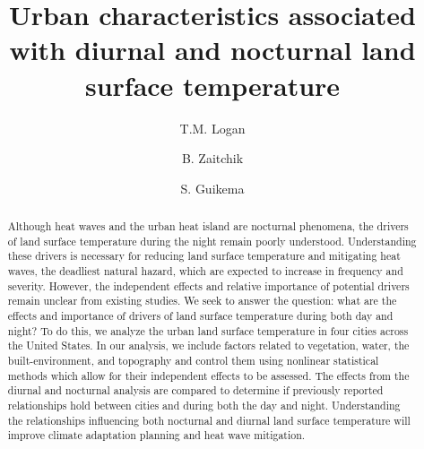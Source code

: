 \documentclass[final,3p,times,twocolumn,sort&compress]{elsarticle}
\begin{document}
\begin{frontmatter}

\title{Urban characteristics associated with diurnal and nocturnal land surface temperature}

\author[1]{T.M. Logan}

\author[2]{B. Zaitchik}
\author[1]{S. Guikema}


\address[1]{Industrial and Operations Engineering, University of Michigan, Ann Arbor, MI}
\address[2]{Earth and Planetary Sciences, Johns Hopkins University, Baltimore, MD}

\begin{abstract}
Although heat waves and the urban heat island are nocturnal phenomena, the drivers of land surface temperature during the night remain poorly understood.
Understanding these drivers is necessary for reducing land surface temperature and mitigating heat waves, the deadliest natural hazard, which are expected to increase in frequency and severity.
However, the independent effects and relative importance of potential drivers remain unclear from existing studies.
We seek to answer the question: what are the effects and importance of drivers of land surface temperature during both day and night?
To do this, we analyze the urban land surface temperature in four cities across the United States.
In our analysis, we include factors related to vegetation, water, the built-environment, and topography and control them using nonlinear statistical methods which allow for their independent effects to be assessed.
The effects from the diurnal and nocturnal analysis are compared to determine if previously reported relationships hold between cities and during both the day and night.
Understanding the relationships influencing both nocturnal and diurnal land surface temperature will improve climate adaptation planning and heat wave mitigation.
\end{abstract}

\begin{keyword}

\end{keyword}

\end{frontmatter}
\end{document}

